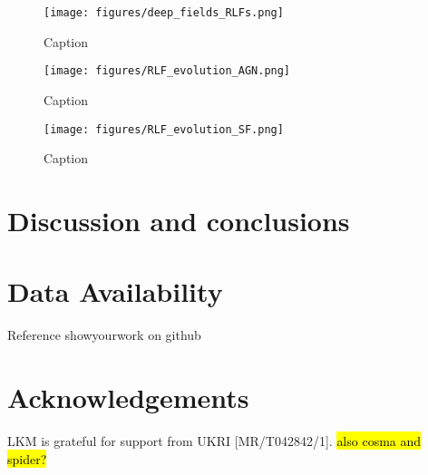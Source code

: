 \documentclass[usenatbib,fleqn]{mnras}
\begin{document}
\begin{figure*}
    \centering
    \texttt{[image: figures/deep\_fields\_RLFs.png]}
    \caption{Caption}
    \label{fig:msrlfs}
\end{figure*}

\begin{figure*}
    \centering
    \texttt{[image: figures/RLF\_evolution\_AGN.png]}
    \caption{Caption}
    \label{fig:agn_evolution}
\end{figure*}

\begin{figure*}
    \centering
    \texttt{[image: figures/RLF\_evolution\_SF.png]}
    \caption{Caption}
    \label{fig:sf_evolution}
\end{figure*}


\section{Discussion and conclusions}


\section*{Data Availability}
Reference showyourwork on github

\section*{Acknowledgements}
LKM is grateful for support from UKRI [MR/T042842/1]. \hl{also cosma and spider?}




\label{lastpage}
\end{document}
